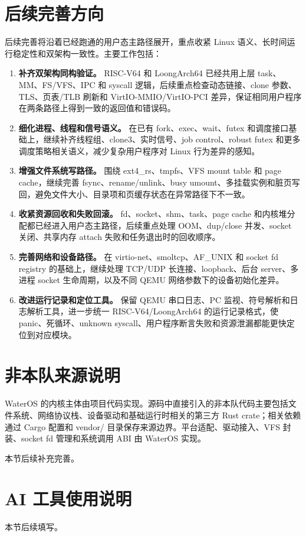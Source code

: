 \documentclass[12pt,openany,oneside,AutoFakeBold=true]{ctexbook}
\newcommand{\code}[1]{\textnormal{\rmfamily #1}}
\newcommand{\syscall}[1]{\textnormal{\rmfamily #1}}
\newcommand{\wosstrong}[1]{{\songti\bfseries #1}}
\begin{document}
\section{后续完善方向}

后续完善将沿着已经跑通的用户态主路径展开，重点收紧 Linux 语义、长时间运行稳定性和双架构一致性。主要工作包括：

\begin{enumerate}
  \item \wosstrong{补齐双架构同构验证。} RISC-V64 和 LoongArch64 已经共用上层 task、MM、FS/VFS、IPC 和 syscall 逻辑，后续重点检查动态链接、\syscall{clone} 参数、TLS、页表/TLB 刷新和 VirtIO-MMIO/VirtIO-PCI 差异，保证相同用户程序在两条路径上得到一致的返回值和错误码。
  \item \wosstrong{细化进程、线程和信号语义。} 在已有 fork、exec、wait、futex 和调度接口基础上，继续补齐线程组、\syscall{clone3}、实时信号、job control、robust futex 和更多调度策略相关语义，减少复杂用户程序对 Linux 行为差异的感知。
  \item \wosstrong{增强文件系统写路径。} 围绕 ext4\_rs、tmpfs、VFS mount table 和 page cache，继续完善 \syscall{fsync}、rename/unlink、busy umount、多挂载实例和脏页写回，避免文件大小、目录项和页缓存状态在异常路径下不一致。
  \item \wosstrong{收紧资源回收和失败回滚。} fd、socket、shm、task、page cache 和内核堆分配都已经进入用户态主路径，后续重点处理 OOM、dup/close 并发、socket 关闭、共享内存 attach 失败和任务退出时的回收顺序。
  \item \wosstrong{完善网络和设备路径。} 在 virtio-net、smoltcp、AF\_UNIX 和 socket fd registry 的基础上，继续处理 TCP/UDP 长连接、loopback、后台 server、多进程 socket 生命周期，以及不同 QEMU 网络参数下的设备初始化差异。
  \item \wosstrong{改进运行记录和定位工具。} 保留 QEMU 串口日志、PC 监视、符号解析和日志解析工具，进一步统一 RISC-V64/LoongArch64 的运行记录格式，使 panic、死循环、unknown syscall、用户程序断言失败和资源泄漏都能更快定位到对应模块。
\end{enumerate}

\section{非本队来源说明}

WaterOS 的内核主体由项目代码实现。源码中直接引入的非本队代码主要包括文件系统、网络协议栈、设备驱动和基础运行时相关的第三方 Rust crate；相关依赖通过 Cargo 配置和 \code{vendor/} 目录保存来源边界。平台适配、驱动接入、VFS 封装、socket fd 管理和系统调用 ABI 由 WaterOS 实现。

本节后续补充完善。

\section{AI 工具使用说明}

本节后续填写。
\end{document}
